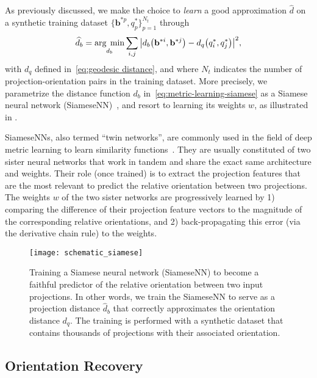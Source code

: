 As previously discussed, we make the choice to \textit{learn} a good approximation $\widehat{d}$ on a synthetic training dataset $\big\{ \mathbf{b}^{*p}, q^*_p\big\}_{p=1}^{N_t}$ through
\begin{equation}
    \label{eq:metric-learning-siamese}
    \widehat{d}_b=\underset{d_b}{\arg\;\min}\sum_{i,j} \big|d_b\big(\mathbf{b}^{*i},\mathbf{b}^{*j}\big) - d_q\big(q^*_i,q^*_j\big) \big|^2,
\end{equation}
with $d_q$ defined in~\eqref{eq:geodesic distance}, and where $N_t$ indicates the number of projection-orientation pairs in the training dataset. More precisely, we parametrize the distance function $d_b$ in~\eqref{eq:metric-learning-siamese} as a Siamese neural network (SiameseNN)~\cite{chopra2005learning}, and resort to learning its weights $w$, as illustrated in .

SiameseNNs, also termed ``twin networks'', are commonly used in the field of deep metric learning to learn similarity functions~\cite{yi2014deep}. They are usually constituted of two sister neural networks that work in tandem and share the exact same architecture and weights.  Their role (once trained) is to extract the projection features that are the most relevant to predict the relative orientation between two projections. The weights $w$ of the two sister networks are progressively learned by 1) comparing the difference of their projection feature vectors to the magnitude of the corresponding relative orientations, and 2) back-propagating this error (via the derivative chain rule) to the weights.

\begin{figure}
    \centering
    \texttt{[image: schematic\_siamese]}
    \caption{Training a Siamese neural network (SiameseNN) to become a faithful predictor of the relative orientation between two input projections. In other words, we train the SiameseNN to serve as a projection distance $\widehat{d}_b$ that correctly approximates the orientation distance $d_q$. The training is performed with a synthetic dataset that contains thousands of projections with their associated orientation.}
    \label{fig:schematic-siamese}
\end{figure}

\subsection{Orientation Recovery}
\label{sec:orientation-recovery}


